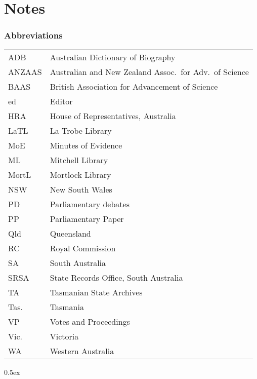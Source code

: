 
\chapter{Notes}
\label{ch:notes}


\small

\subsection*{Abbreviations} 

\begin{tabular}{ll}
	ADB	& Australian Dictionary of Biography\\
	ANZAAS	& Australian and New Zealand Assoc.\ for Adv.\ of
                              Science\\
       	BAAS	& British Association for Advancement of Science\\
	ed	& Editor\\
	HRA	& House of Representatives, Australia\\
	LaTL	& La Trobe Library\\
	MoE	& Minutes of Evidence\\
	ML	& Mitchell Library\\
	MortL	& Mortlock Library\\
	NSW	& New South Wales\\
	PD	& Parliamentary debates\\
	PP	& Parliamentary Paper\\
	Qld	& Queensland\\
	RC	& Royal Commission\\
	SA	& South Australia\\
	SRSA	& State Records Office, South Australia\\
	TA	& Tasmanian State Archives\\
	Tas.	& Tasmania\\
	VP	& Votes and Proceedings\\
	Vic.	& Victoria\\
	WA	& Western Australia\\
\end{tabular}

\begingroup
\parindent 0pt
\parskip   0.5ex
\renewcommand{\enotesize}{\small}
\theendnotes
\endgroup




